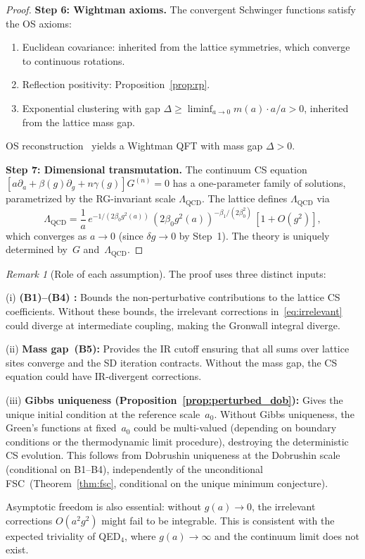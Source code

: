 \documentclass[11pt,a4paper]{article}
\theoremstyle{plain}
\theoremstyle{definition}
\theoremstyle{remark}
\newtheorem{remark}[theorem]{Remark}
\begin{document}
\begin{proof}
\smallskip
\textbf{Step 6: Wightman axioms.}
The convergent Schwinger functions satisfy the OS axioms:
\begin{enumerate}[label=(\roman*),nosep]
  \item Euclidean covariance: inherited from the lattice
    symmetries, which converge to continuous rotations.
  \item Reflection positivity: Proposition~\ref{prop:rp}.
  \item Exponential clustering with gap
    $\Delta \geq \liminf_{a \to 0} m(a) \cdot a /a > 0$,
    inherited from the lattice mass gap.
\end{enumerate}
OS reconstruction~\cite{OsterwalderSchrader} yields a
Wightman QFT with mass gap $\Delta > 0$.

\smallskip
\textbf{Step 7: Dimensional transmutation.}
The continuum CS equation $[a\partial_a + \beta(g)\partial_g
+ n\gamma(g)]G^{(n)} = 0$ has a one-parameter family of
solutions, parametrized by the RG-invariant scale
$\Lambda_{\mathrm{QCD}}$.  The lattice defines
$\Lambda_{\mathrm{QCD}}$ via
\begin{equation}
  \Lambda_{\mathrm{QCD}}
  = \frac{1}{a}\,e^{-1/(2\beta_0 g^2(a))}
  \,(2\beta_0 g^2(a))^{-\beta_1/(2\beta_0^2)}\,
  [1 + O(g^2)],
\end{equation}
which converges as $a \to 0$ (since $\delta g \to 0$
by Step~1).
The theory is uniquely determined by~$G$
and~$\Lambda_{\mathrm{QCD}}$.
\end{proof}

\begin{remark}[Role of each assumption]
\label{rem:uniqueness_roles}
The proof uses three distinct inputs:

\smallskip\noindent
(i) \textbf{(B1)--(B4) \cite{FontesSU2}:}
Bounds the non-perturbative contributions to the lattice
CS coefficients.  Without these bounds, the irrelevant
corrections in~\eqref{eq:irrelevant} could diverge at
intermediate coupling, making the Gronwall integral
diverge.

\smallskip\noindent
(ii) \textbf{Mass gap~(B5):} Provides the IR cutoff
ensuring that all sums over lattice sites converge and
the SD iteration contracts.  Without the mass gap, the
CS equation could have IR-divergent corrections.

\smallskip\noindent
(iii) \textbf{Gibbs uniqueness
(Proposition~\ref{prop:perturbed_dob}):} Gives the
unique initial condition at the reference scale~$a_0$.
Without Gibbs uniqueness, the Green's functions at
fixed~$a_0$ could be multi-valued (depending on boundary
conditions or the thermodynamic limit procedure),
destroying the deterministic CS evolution.
This follows from Dobrushin uniqueness at the Dobrushin
scale (conditional on B1--B4), independently of the
unconditional FSC~(Theorem~\ref{thm:fsc},
conditional on the unique minimum conjecture).

\smallskip\noindent
Asymptotic freedom is also essential: without $g(a) \to 0$,
the irrelevant corrections $O(a^2 g^2)$ might fail to be
integrable.  This is consistent with the expected triviality
of QED$_4$, where $g(a) \to \infty$ and the continuum
limit does not exist.
\end{remark}
\end{document}
